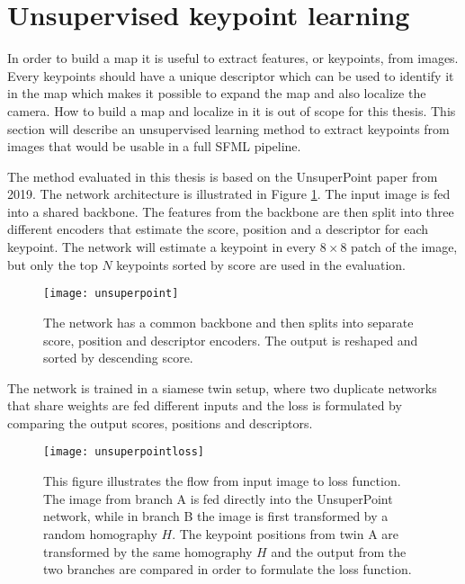 \newpage
\section{Unsupervised keypoint learning}

In order to build a map it is useful to extract features, or keypoints, from images. Every keypoints should have a unique descriptor which can be used to identify it in the map which makes it possible to expand the map and also localize the camera. How to build a map and localize in it is out of scope for this thesis. This section will describe an unsupervised learning method to extract keypoints from images that would be usable in a full SFML pipeline.

The method evaluated in this thesis is based on the UnsuperPoint paper \cite{unsuperpoint} from 2019. The network architecture is illustrated in Figure \ref{fig:unsuperpoint}. The input image is fed into a shared backbone. The features from the backbone are then split into three different encoders that estimate the score, position and a descriptor for each keypoint. The network will estimate a keypoint in every $8\times 8$ patch of the image, but only the top $N$ keypoints sorted by score are used in the evaluation.

\begin{figure}[H]
	\centering
	\texttt{[image: unsuperpoint]}
	\caption{The network has a common backbone and then splits into separate score, position and descriptor encoders. The output is reshaped and sorted by descending score.}
	\label{fig:unsuperpoint}
\end{figure}

The network is trained in a siamese twin setup, where two duplicate networks that share weights are fed different inputs and the loss is formulated by comparing the output scores, positions and descriptors.

\begin{figure}[H]
	\centering
	\texttt{[image: unsuperpointloss]}
	\caption{This figure illustrates the flow from input image to loss function. The image from branch A is fed directly into the UnsuperPoint network, while in branch B the image is first transformed by a random homography $H$. The keypoint positions from twin A are transformed by the same homography $H$ and the output from the two branches are compared in order to formulate the loss function.}
	\label{fig:unsuperpointloss}
\end{figure}


